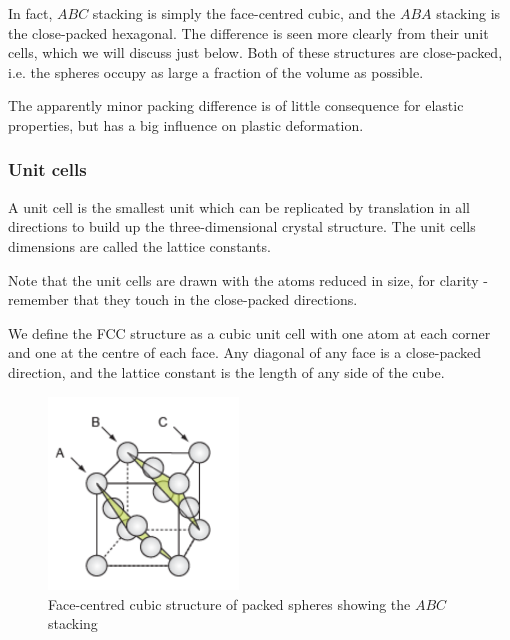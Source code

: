 \documentclass{article}
\begin{document}
In fact, $ABC$ stacking is simply the face-centred cubic, and the $ABA$ stacking is the close-packed hexagonal. The difference is seen more clearly from their unit cells, which we will discuss just below. Both of these structures are close-packed, i.e. the spheres occupy as large a fraction of the volume as possible.

The apparently minor packing difference is of little consequence for elastic properties, but has a big influence on plastic deformation.

\subsubsection{Unit cells}

\begin{definition}
    A unit cell is the smallest unit which can be replicated by translation in all directions to build up the three-dimensional crystal structure. The unit cells dimensions are called the lattice constants.
\end{definition}

Note that the unit cells are drawn with the atoms reduced in size, for clarity - remember that they touch in the close-packed directions.

\begin{definition}
    We define the FCC structure as a cubic unit cell with one atom at each corner and one at the centre of each face. Any diagonal of any face is a close-packed direction, and the lattice constant is the length of any side of the cube.
\end{definition}

\begin{figure}[h]
    \centering
    \includegraphics[width = 0.45\textwidth]{images/mat4.png}
    \caption{Face-centred cubic structure of packed spheres showing the $ABC$ stacking}
    \label{fig:enter-label}
\end{figure}
\end{document}
